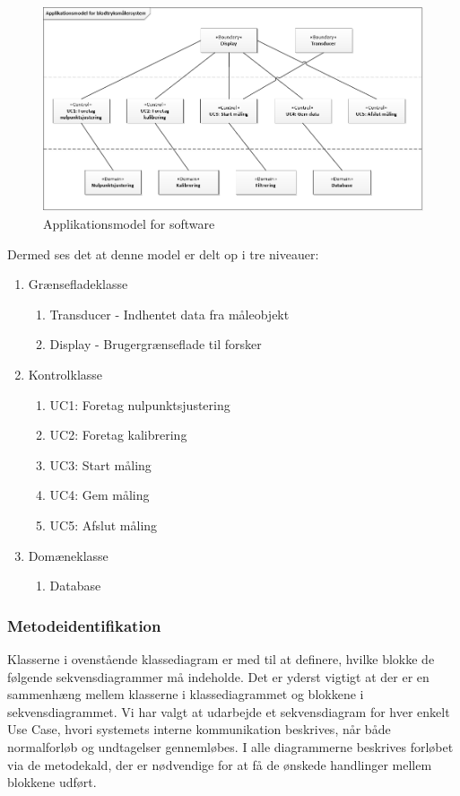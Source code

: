 \begin{figure}[H]
	\centering
	\includegraphics[width=1.0\textwidth]{Figurer/Applikationsmodel}
	\caption{Applikationsmodel for software}
\end{figure}

Dermed ses det at denne model er delt op i tre niveauer:
\begin{enumerate}
\item Grænsefladeklasse
\begin{enumerate}
\item Transducer - Indhentet data fra måleobjekt
\item Display - Brugergrænseflade til forsker
\end{enumerate}
\item Kontrolklasse
\begin{enumerate}
\item UC1: Foretag nulpunktsjustering
\item UC2: Foretag kalibrering
\item UC3: Start måling
\item UC4: Gem måling
\item UC5: Afslut måling
\end{enumerate}
\item Domæneklasse
\begin{enumerate}
\item Database
\end{enumerate}
\end{enumerate}

\subsubsection{Metodeidentifikation}
Klasserne i ovenstående klassediagram er med til at definere, hvilke blokke de følgende sekvensdiagrammer må indeholde. Det er yderst vigtigt at der er en sammenhæng mellem klasserne i klassediagrammet og blokkene i sekvensdiagrammet. Vi har valgt at udarbejde et sekvensdiagram for hver enkelt Use Case, hvori systemets interne kommunikation beskrives, når både normalforløb og undtagelser gennemløbes. I alle diagrammerne beskrives forløbet via de metodekald, der er nødvendige for at få de ønskede handlinger mellem blokkene udført. 

